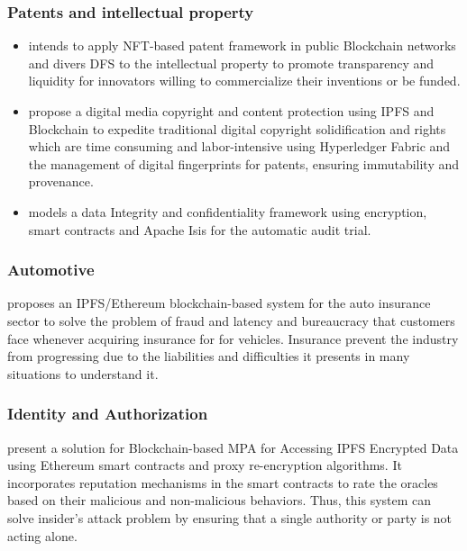\subsubsection{Patents and intellectual property}
\begin{itemize}
    \item \cite{bamakan2022patents} intends to apply \ac{NFT}-based patent framework in public Blockchain networks and divers \ac{DFS}  to the intellectual property to promote transparency and liquidity for innovators willing to commercialize their inventions or be funded.
    
    \item \cite{agyekum2019digital} propose a digital media copyright and content protection using \ac{IPFS} and Blockchain to expedite traditional digital copyright solidification and rights which are time consuming and labor-intensive using Hyperledger Fabric and the management of digital fingerprints for patents, ensuring immutability and provenance.
    
    \item \cite{8591029} models a data Integrity and confidentiality framework using encryption, smart contracts and Apache Isis for the automatic audit trial. 
 
\end{itemize}

\subsubsection{Automotive}
\cite{nizamuddin2021blockchain} proposes an \ac{IPFS}/Ethereum blockchain-based system for the auto insurance sector to solve the problem of fraud and latency and bureaucracy that customers face whenever acquiring insurance for for vehicles. Insurance prevent the industry from progressing due to the liabilities and difficulties it presents in many situations to understand it.

\subsubsection{Identity and Authorization}
\cite{9240966} present a solution for Blockchain-based \ac{MPA} for Accessing IPFS Encrypted Data using Ethereum smart contracts and proxy re-encryption algorithms. It incorporates reputation mechanisms in the smart contracts to rate the oracles based on their malicious and non-malicious behaviors. Thus, this system can solve insider's attack problem by ensuring that a single authority or party is not acting alone. 

